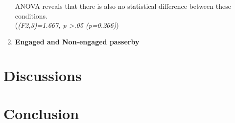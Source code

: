 \begin{enumerate}
ANOVA reveals that there is also no statistical difference between these conditions. \\
(\emph{(F2,3)=1.667, p >.05 (p=0.266)})



\item \textbf{Engaged and Non-engaged passerby}


\begin{table}[H]
\caption{Number of engaged passerby in three weeks}
\label{tab:engagedofthreeweeks}
\centering
{}
\end{table}



\end{enumerate}



\section{Discussions}




\section{Conclusion}
